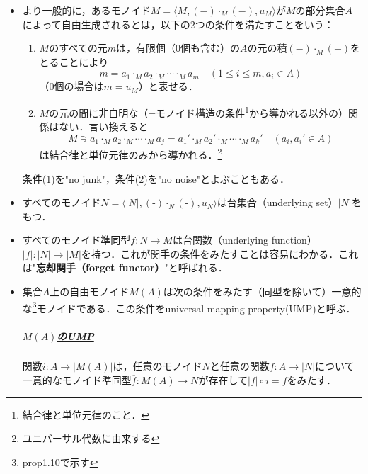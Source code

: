 \documentclass[dvipdfmx,a4j,10pt]{jsarticle}
\theoremstyle{mystyle1}
\theoremstyle{mystyle2}
\theoremstyle{mystyle3}
\begin{document}
\begin{itemize}
    \item より一般的に，あるモノイド$M=\langle M,(\mathrm{-})\cdot_M(\mathrm{-}),u_M\rangle$が$M$の部分集合$A$によって自由生成されるとは，以下の2つの条件を満たすことをいう：
          \begin{enumerate}
              \item $M$のすべての元$m$は，有限個（0個も含む）の$A$の元の積$(\mathrm{-})\cdot_M(\mathrm{-})$をとることにより
                    \[
                        m=a_1\cdot_M a_2\cdot_M\cdots\cdot_M a_m\quad(1\leq i\leq m,a_i\in A)
                    \]
                    （0個の場合は$m=u_M$）と表せる．
              \item $M$の元の間に非自明な（=モノイド構造の条件\footnote{結合律と単位元律のこと．}から導かれる以外の）関係はない．言い換えると
                    \[
                        M\ni a_1\cdot_M a_2\cdot_M\cdots\cdot_M a_j = a_1'\cdot_Ma_2'\cdot_M\cdots\cdot_M a_k'\quad(a_i,a_i'\in A)
                    \]
                    は結合律と単位元律のみから導かれる．\footnote{ユニバーサル代数に由来する}
          \end{enumerate}
          条件(1)を"no junk"，条件(2)を"no noise"とよぶこともある．
    \item すべてのモノイド$N=\langle|N|,(\textrm{-})\cdot_N(\textrm{-}),u_N\rangle$は台集合（underlying set）$|N|$をもつ．
    \item すべてのモノイド準同型$f:N\to M$は台関数（underlying function）$|f|:|N|\to|M|$を持つ．これが関手の条件をみたすことは容易にわかる．これは"\textbf{忘却関手（forget functor）}"と呼ばれる．
    \item 集合$A$上の自由モノイド$M(A)$は次の条件をみたす（同型を除いて）一意的な\footnote{prop1.10で示す}モノイドである．この条件をuniversal mapping property(UMP)と呼ぶ．
          \subparagraph{\underline{$M(A)$のUMP}}
          関数$i:A\to|M(A)|$は，任意のモノイド$N$と任意の関数$f:A\to|N|$について一意的なモノイド準同型$\overline{f}:M(A)\to N$が存在して$|f|\circ i=f$をみたす．


\end{itemize}
\end{document}
